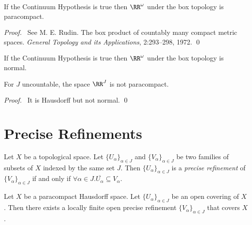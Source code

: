 \begin{theorem}
    If the Continuum Hypothesis is true then $\RR^\omega$ under the box topology
    is paracompact.
\end{theorem}

\begin{proof}
    \pf\ See M. E. Rudin. The box product of countably many compact metric spaces.
    \emph{General Topology and its Applications}, 2:293--298, 1972. \qed
\end{proof}

\begin{corollary}
    If the Continuum Hypothesis is true then $\RR^\omega$ under the box topology is normal.
\end{corollary}

\begin{proposition}
    For $J$ uncountable, the space $\RR^J$ is not paracompact.
\end{proposition}

\begin{proof}
    \pf\ It is Hausdorff but not normal. \qed
\end{proof}

\section{Precise Refinements}

\begin{definition}
    Let $X$ be a topological space. Let $\{ U_\alpha \}_{\alpha \in J}$ and $\{ V_\alpha \}_{\alpha \in J}$
    be two families of subsets of $X$ indexed by the same set $J$. Then $\{ U_\alpha \}_{\alpha \in J}$
    is a \emph{precise refinement} of $\{ V_\alpha \}_{\alpha \in J}$ if and only if
    $\forall \alpha \in J. \overline{U_\alpha} \subseteq V_\alpha$.
\end{definition}

\begin{lemma}
    Let $X$ be a paracompact Hausdorff space. Let $\{ U_\alpha \}_{\alpha \in J}$ be an open covering of $X$.
    Then there exists a locally finite open precise refinement $\{ V_\alpha \}_{\alpha \in J}$ 
    that covers $X$.
\end{lemma}

